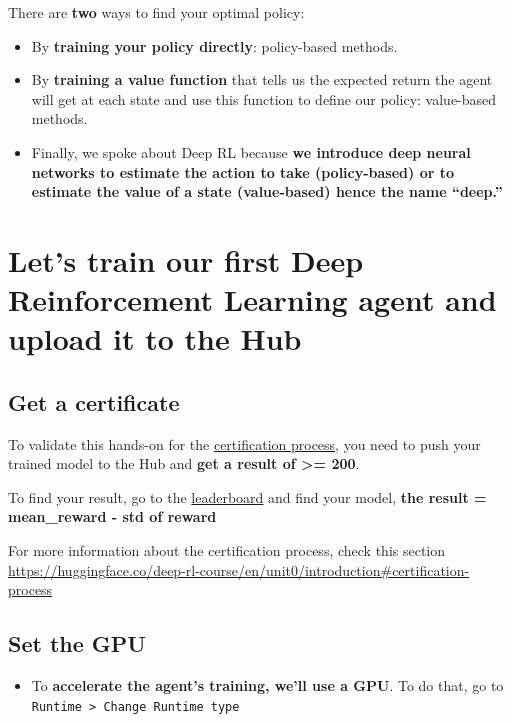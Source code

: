 \documentclass[11pt,a4paper]{article}
\begin{document}
There are \textbf{two} ways to find your optimal policy:

\begin{itemize}
\item
  By \textbf{training your policy directly}: policy-based methods.
\item
  By \textbf{training a value function} that tells us the expected return the agent will get at each state and use this function to define our policy: value-based methods.
\item
  Finally, we spoke about Deep RL because \textbf{we introduce deep neural networks to estimate the action to take (policy-based) or to estimate the value of a state (value-based) hence the name ``deep.''}
\end{itemize}

\section{Let's train our first Deep Reinforcement Learning agent and upload it to the Hub}\label{lets-train-our-first-deep-reinforcement-learning-agent-and-upload-it-to-the-hub}

\subsection{Get a certificate}\label{get-a-certificate}

To validate this hands-on for the \href{https://huggingface.co/deep-rl-course/en/unit0/introduction\#certification-process}{certification process}, you need to push your trained model to the Hub and \textbf{get a result of \textgreater= 200}.

To find your result, go to the \href{https://huggingface.co/spaces/huggingface-projects/Deep-Reinforcement-Learning-Leaderboard}{leaderboard} and find your model, \textbf{the result = mean\_reward - std of reward}

For more information about the certification process, check this section \url{https://huggingface.co/deep-rl-course/en/unit0/introduction\#certification-process}

\subsection{Set the GPU}\label{set-the-gpu}

\begin{itemize}
\tightlist
\item
  To \textbf{accelerate the agent's training, we'll use a GPU}. To do that, go to \passthrough{\lstinline!Runtime > Change Runtime type!}
\end{itemize}
\end{document}
